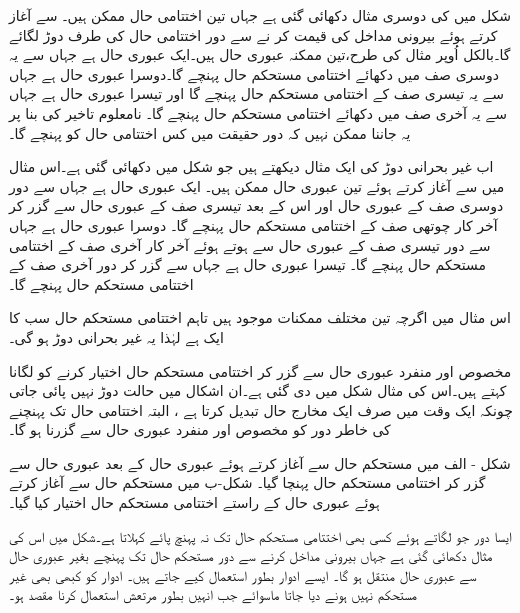 شکل میں   کی دوسری مثال دکھائی گئی ہے جہاں تین اختتامی  حال  ممکن ہیں۔   سے آغاز کرتے ہوئے بیرونی مداخل   کی قیمت   کر نے سے دور اختتامی حال کی طرف دوڑ لگائے گا۔بالکل اُوپر مثال کی طرح،تین ممکنہ عبوری  حال  ہیں۔ایک عبوری  حال  ہے جہاں سے یہ دوسری صف میں دکھائے اختتامی مستحکم حال   پہنچے گا۔دوسرا عبوری  حال   ہے جہاں سے یہ تیسری صف کے اختتامی مستحکم حال   پہنچے گا اور تیسرا عبوری  حال  ہے جہاں سے یہ آخری صف میں دکھائے اختتامی مستحکم حال   پہنچے گا۔ نامعلوم  تاخیر کی بنا پر یہ جاننا ممکن نہیں کہ دور  حقیقت  میں کس اختتامی حال  کو پہنچے گا۔

اب غیر بحرانی دوڑ کی ایک مثال  دیکھتے ہیں جو شکل   میں دکھائی گئی ہے۔اس مثال میں   سے  آغاز کرتے  ہوئے تین عبوری حال  ممکن ہیں۔ ایک عبوری حال    ہے جہاں سے دور دوسری صف کے عبوری حال   اور  اس کے بعد  تیسری صف کے عبوری حال   سے  گزر کر آخر کار  چوتھی صف کے اختتامی مستحکم حال    پہنچے گا۔ دوسرا  عبوری حال   ہے جہاں سے   دور تیسری صف کے عبوری حال   سے ہوتے ہوئے آخر کار آخری صف کے اختتامی مستحکم حال      پہنچے گا۔  تیسرا عبوری حال   ہے جہاں سے  گزر کر دور   آخری صف کے اختتامی مستحکم حال   پہنچے گا۔

اس مثال میں اگرچہ تین مختلف ممکنات موجود ہیں تاہم  اختتامی مستحکم حال سب کا ایک   ہے لہٰذا  یہ غیر بحرانی دوڑ  ہو گی۔  

 مخصوص اور منفرد عبوری حال   سے گزر کر اختتامی مستحکم  حال  اختیار کرنے کو  لگانا کہتے ہیں۔اس کی  مثال شکل  میں دی گئی ہے۔ان  اشکال میں حالت  دوڑ  نہیں پائی جاتی چونکہ ایک وقت میں صرف ایک مخارج حال تبدیل کرتا ہے ، البتہ اختتامی حال تک پہنچنے کی خاطر دور کو مخصوص اور منفرد عبوری حال   سے گزرنا ہو گا۔

شکل - الف  میں   مستحکم حال  سے  آغاز کرتے ہوئے عبوری حال    کے بعد عبوری حال  سے  گزر کر اختتامی مستحکم  حال    پہنچا گیا۔   شکل-ب میں مستحکم حال    سے  آغاز کرتے ہوئے عبوری حال    کے راستے  اختتامی  مستحکم حال   اختیار کیا  گیا۔


 ایسا دور جو   لگاتے ہوئے کسی بھی اختتامی مستحکم حال تک نہ پہنچ پائے   کہلاتا ہے۔شکل  میں اس کی مثال دکھائی گئی ہے جہاں بیرونی مداخل    کرنے سے دور   مستحکم حال تک پہنچے بغیر عبوری حال  سے عبوری حال  منتقل ہو گا۔	ایسے  ادوار بطور استعمال کیے جاتے ہیں۔ ادوار کو کبھی بھی غیر مستحکم نہیں ہونے دیا جاتا ماسوائے جب انہیں بطور مرتعش استعمال کرنا مقصد ہو۔

